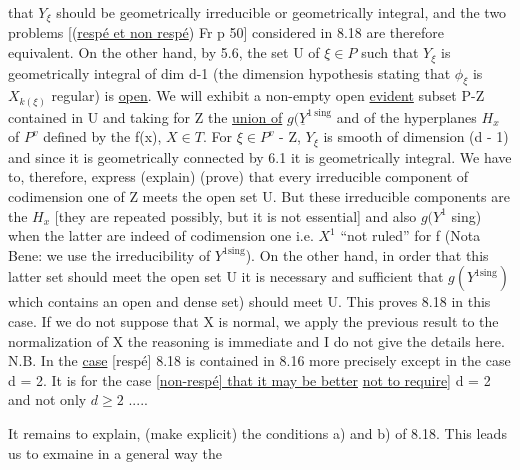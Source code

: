 
that $Y_{\xi}$ should be geometrically irreducible or geometrically
integral, and the two problems [(\uline{respé et non respé}) Fr p 50]
considered in 8.18 are therefore equivalent. On the other hand,
by 5.6, the set U of $\xi \in P$ such that $Y_{\xi}$ is geometrically integral
of dim d-1 (the dimension hypothesis stating that $\phi_{\xi}$ is $X_{k(\xi)}$
regular) is \uline{open}. We will exhibit a non-empty open \uline{evident} subset
P-Z contained in U and taking for Z the \uline{union of} $g(\underline{Y}^{1\ \mathrm{sing}}$ and of
the hyperplanes $H_{x}$ of $P^{v}$ defined by the f(x), $X \in T$. For $\xi \in P^{v}$ -
Z, $Y_{\xi}$ is smooth of dimension
(d - 1) and since it is geometrically connected by 6.1 it is
geometrically integral. We have to, therefore, express (explain)
(prove) that every irreducible component of codimension one of Z
meets the open set U. But these irreducible components are the $H_{x}$
[they are repeated possibly, but it is not essential] and also $g(Y^{1}$
sing) when the latter are indeed of codimension one i.e. $X^{1}$ ``not
ruled'' for f (Nota Bene: we use the irreducibility of $Y^{1\mathrm{sing}}$). On
the other hand, in order that this latter set should meet the open
set U it is necessary and sufficient that $g(Y^{1\mathrm{sing}})$ which contains
an open and dense set) should meet U. This proves 8.18 in this
case. If we do not suppose that X is normal, we apply the
previous result to the normalization of X the reasoning is
immediate and I do not give the details here. N.B. In the \uline{case}
[respé] 8.18 is contained in 8.16 more precisely except in the
case d = 2. It is for the case [\uline{non-respé] that it may be better}
\uline{not to require]} d = 2 and not only $d \geq 2$ .....

It remains to explain, (make explicit) the conditions a) and
b) of 8.18. This leads us to exmaine in a general way the
